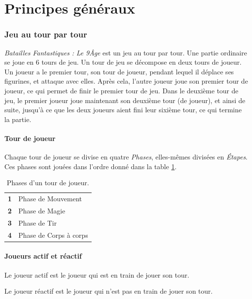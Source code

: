 
\part{Principes généraux}

\section{Jeu au tour par tour}

\emph{Batailles Fantastiques : Le 9\ieme Âge} est un jeu au tour par tour. Une partie ordinaire se joue en 6 tours de jeu. Un tour de jeu se décompose en deux tours de joueur. Un joueur a le premier tour, son tour de joueur, pendant lequel il déplace ses figurines, et attaque avec elles. Après cela, l'autre joueur joue son premier tour de joueur, ce qui permet de finir le premier tour de jeu. Dans le deuxième tour de jeu, le premier joueur joue maintenant son deuxième tour (de joueur), et ainsi de suite, jusqu'à ce que les deux joueurs aient fini leur sixième tour, ce qui termine la partie.

\subsection{Tour de joueur}

Chaque tour de joueur se divise en quatre \emph{Phases}, elles-mêmes divisées en \emph{Étapes}. Ces phases sont jouées dans l'ordre donné dans la table \ref{table/phases}.

\begin{table}[!htbp]
\centering
\begin{tabular}{c|l}
\textbf{1} & Phase de Mouvement \tabularnewline
\textbf{2} & Phase de Magie \tabularnewline
\textbf{3} & Phase de Tir \tabularnewline
\textbf{4} & Phase de Corps à corps \tabularnewline
\end{tabular}
\caption{\label{table/phases}Phases d'un tour de joueur.}
\end{table}

\subsection{Joueurs actif et réactif}

Le joueur actif est le joueur qui est en train de jouer son tour.

Le joueur réactif est le joueur qui n'est pas en train de jouer son tour.

